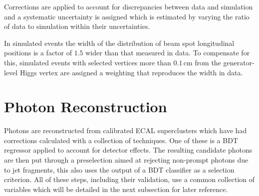 Corrections are applied to account for discrepancies between data and simulation and a systematic uncertainty is assigned which is estimated by varying the ratio of data to simulation within their uncertainties. 

In simulated events the width of the distribution of beam spot longitudinal positions is a factor of $1.5$ wider than that measured in data. 
To compensate for this, simulated events with selected vertices more than $0.1$\,cm from the generator-level Higgs vertex are assigned a weighting that reproduces the width in data. 




\section{Photon Reconstruction}
Photons are reconstructed from calibrated ECAL superclusters which have had corrections calculated with a collection of techniques. One of these is a BDT regressor applied to account for detector effects. The resulting candidate photons are then put through a preselection aimed at rejecting non-prompt photons due to jet fragments, this also uses the output of a BDT classifier as a selection criterion.
All of these steps, including their validation, use a common collection of variables which will be detailed in the next subsection for later reference. 

